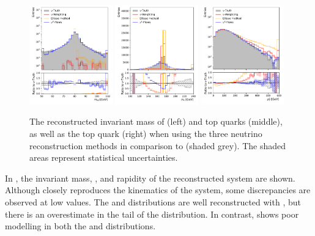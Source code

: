 \begin{figure}[htbp]
    \centering
    \includegraphics[width=0.32\textwidth]{Figures/neutrino_unfolding/ttbar_reco/W_plusW_minus_m.pdf}
    \includegraphics[width=0.32\textwidth]{Figures/neutrino_unfolding/ttbar_reco/topanti_top_m.pdf}
    \includegraphics[width=0.32\textwidth]{Figures/neutrino_unfolding/ttbar_reco/topanti_top_pt.pdf}
    \caption{The reconstructed invariant mass of \Wbosons (left) and top quarks (middle), as well as the top quark \pt (right) when using the three neutrino reconstruction methods in comparison to \vtruth (shaded grey). The shaded areas represent statistical uncertainties.}
    \label{fig:Wtmasspt}
\end{figure}

In , the invariant mass, \pt, and rapidity of the reconstructed \ttbar system \ytt are shown.
Although \vvflows closely reproduces the kinematics of the \ttbar system, some discrepancies are observed at low \mttbar values.
The \pttt and \ytt distributions are well reconstructed with \vweight, but there is an overestimate in the tail of the \mttbar distribution.
In contrast, \ellipse shows poor modelling in both the \mttbar and \pttt distributions.

